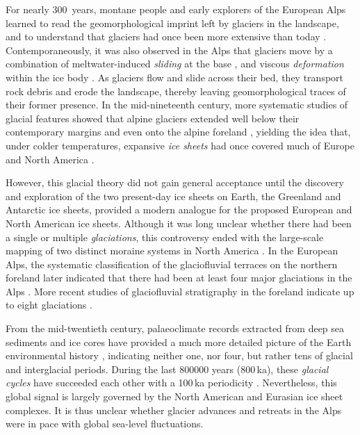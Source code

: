 \documentclass[tc, manuscript]{copernicus}
\begin{document}
    For nearly 300~years, montane people and early explorers of the European
    Alps learned to read the geomorphological imprint left by glaciers in the
    landscape, and to understand that glaciers had once been more extensive
    than today \citep[e.g.,][p.~21]{Windham.Martel.1744}. Contemporaneously,
    it was also observed in the Alps that glaciers move by a combination of
    meltwater-induced \emph{sliding} at the base \citep[\S532]{Saussure.1779},
    and viscous \emph{deformation} within the ice body \citep{Forbes.1846b}. As
    glaciers flow and slide across their bed, they transport rock debris and
    erode the landscape, thereby leaving geomorphological traces of their
    former presence. In the mid-nineteenth
    century, more systematic studies of glacial features showed that alpine
    glaciers extended well below their contemporary margins \citep{Venetz.1821}
    and even onto the alpine foreland \citep{Charpentier.1841}, yielding the
    idea that, under colder temperatures, expansive \emph{ice sheets} had once
    covered much of Europe and North America \citep{Agassiz.1840}.

    However, this glacial theory did not gain general acceptance until the
    discovery and exploration of the two present-day ice sheets on Earth, the
    Greenland and Antarctic ice sheets, provided a modern analogue for the
    proposed European and North American ice sheets. Although it was long
    unclear whether there had been a single or multiple \emph{glaciations},
    this controversy ended with the large-scale mapping of two distinct moraine
    systems in North America \citep{Chamberlin.1894}. In the European Alps, the
    systematic classification of the glaciofluvial terraces on the northern
    foreland later indicated that there had been at least four major
    glaciations in the Alps \citep{Penck.Bruckner.1909}. More recent studies
    of glaciofluvial stratigraphy in the foreland indicate up to eight
    glaciations \citep{Ivy-Ochs.etal.2008, Preusser.etal.2011}.

    From the mid-twentieth
    century, palaeoclimate records extracted from deep sea sediments and
    ice cores have provided a much more detailed picture of the Earth
    environmental history \citep[e.g.,][]{Emiliani.1955,
    Shackleton.Opdyke.1973, Dansgaard.etal.1993, Augustin.etal.2004},
    indicating neither one, nor four, but rather tens of glacial and
    interglacial periods. During the last 800000 years (800\,ka), these
    \emph{glacial cycles}
    have succeeded each other with a 100\,ka periodicity \citep{Hays.etal.1976,
    Augustin.etal.2004}. Nevertheless, this global signal is largely governed
    by the North American and Eurasian ice sheet complexes. It is thus unclear
    whether glacier advances and retreats in the Alps were in pace with global
    sea-level fluctuations.
\end{document}
